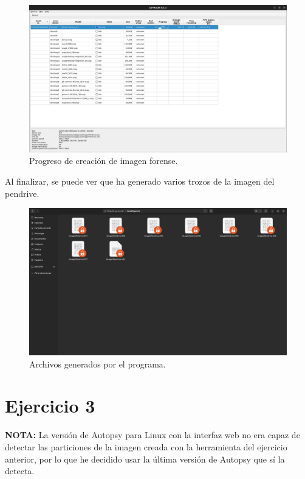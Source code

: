 \documentclass{article}
\begin{document}
\begin{figure}[H]
    \centering
    \includegraphics[width=\textwidth]{imagenes/Captura desde 2022-12-02 19-48-29.png}
    \caption{Progreso de creación de imagen forense.}
\end{figure}

\newpage

Al finalizar, se puede ver que ha generado varios trozos de la imagen del pendrive.

\begin{figure}[H]
    \centering
    \includegraphics[width=\textwidth]{imagenes/Captura desde 2022-12-02 19-50-53.png}
    \caption{Archivos generados por el programa.}
\end{figure}

\newpage

\section{Ejercicio 3}

\textbf{NOTA: }La versión de Autopsy para Linux con la interfaz web no era capaz de detectar las particiones de la imagen creada con la herramienta del ejercicio anterior, por lo que he decidido usar la última versión de Autopsy que sí la detecta.
\end{document}
